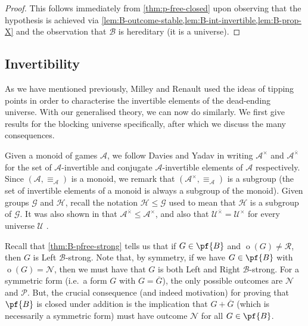 \documentclass[11pt]{article}
\theoremstyle{definition}
\DeclareMathOperator{\outcome}{o}
\newcommand{\set}[1]{\mathcal{#1}}
\begin{document}
\begin{proof}
    This follows immediately from \cref{thm:p-free-closed} upon observing that
    the hypothesis is achieved via
    \cref{lem:B-outcome-stable,lem:B-int-invertible,lem:B-prop-X} and the
    observation that $\set{B}$ is hereditary (it is a universe).
\end{proof}

\subsection{Invertibility}

As we have mentioned previously, Milley and Renault used the ideas of tipping
points in order to characterise the invertible elements of the dead-ending
universe. With our generalised theory, we can now do similarly. We first give
results for the blocking universe specifically, after which we discuss the many
consequences.

Given a monoid of games $\set{A}$, we follow Davies and Yadav
\cite[p.~8]{davies.yadav:invertibility} in writing $\set{A}^\times$ and
$\set{A}^{\overline{\times}}$ for the set of $\set{A}$-invertible and conjugate
$\set{A}$-invertible elements of $\set{A}$ respectively. Since
$(\set{A},\equiv_\set{A})$ is a monoid, we remark that
$(\set{A}^\times,\equiv_\set{A})$ is a subgroup (the set of invertible elements
of a monoid is always a subgroup of the monoid). Given groups $\set{G}$ and
$\set{H}$, recall the notation $\set{H} \leq \set{G}$ used to mean that
$\set{H}$ is a subgroup of $\set{G}$. It was also shown in \cite[Proposition
3.4 on p.~9]{davies.yadav:invertibility} that
$\set{A}^{\overline{\times}}\leq\set{A}^\times$, and also that
$\set{U}^{\overline{\times}}=\set{U}^\times$ for every universe $\set{U}$
\cite[Theorem 3.7 on p.~11]{davies.yadav:invertibility}.

Recall that \cref{thm:B-pfree-strong} tells us that if $G\in\pf{B}$ and
$\outcome(G)\neq\mathscr{R}$, then $G$ is Left $\set{B}$-strong. Note that, by
symmetry, if we have $G\in\pf{B}$ with $\outcome(G)=\mathscr{N}$, then we must
have that $G$ is both Left and Right $\set{B}$-strong. For a symmetric form
(i.e.\ a form $G$ with $G=\overline{G}$), the only possible outcomes are
$\mathscr{N}$ and $\mathscr{P}$. But, the crucial consequence (and indeed
motivation) for proving that $\pf{B}$ is closed under addition is the
implication that $G+\overline{G}$ (which is necessarily a symmetric form) must
have outcome $\mathscr{N}$ for all $G\in\pf{B}$.
\end{document}
